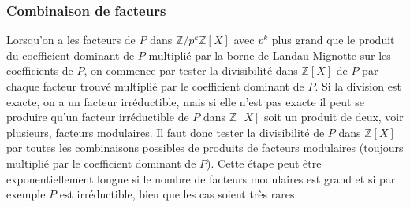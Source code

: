 \documentclass[a4paper,11pt]{article}
\newcommand{\Z}{{\mathbb{Z}}}
\begin{document}
\subsubsection{Combinaison de facteurs}
Lorsqu'on a les facteurs de $P$ dans $\Z/p^k\Z[X]$ avec $p^k$ plus grand
que le produit du coefficient dominant de $P$ multiplié par la borne
de Landau-Mignotte sur les coefficients de $P$, on commence par
tester la divisibilité dans $\Z[X]$ de $P$ par chaque facteur trouvé
multiplié par le coefficient dominant de $P$. Si la division est
exacte, on a un facteur irréductible, mais si elle n'est pas exacte
il peut se produire qu'un facteur irréductible de $P$ dans $\Z[X]$ soit un
produit de deux, voir plusieurs, facteurs modulaires. Il faut
donc tester la divisibilité de $P$ dans $\Z[X]$ par toutes les combinaisons 
possibles de produits de facteurs modulaires (toujours multiplié par
le coefficient dominant de $P$). Cette étape peut être exponentiellement
longue si le nombre de facteurs modulaires est grand et si par
exemple $P$ est irréductible, bien que les cas soient très rares. 
\end{document}
